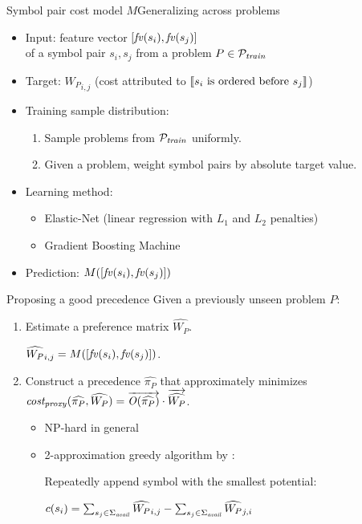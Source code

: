 \documentclass{beamer}
\begin{document}
\begin{frame}{Symbol pair cost model $M$}{Generalizing across problems}
\begin{itemize}
	\item Input: feature vector $[\mathit{fv}(s_i), \mathit{fv}(s_j)]$ \\
	of a symbol pair $s_i, s_j$
	from a problem $P \in \mathcal{P}_{\mathit{train}}$
	\item Target: ${W_P}_{i,j}$ (cost attributed to $\left \llbracket s_i\text{ is ordered before }s_j \right \rrbracket$)
	\item Training sample distribution:
	\begin{enumerate}
		\item Sample problems from $\mathcal{P}_{\mathit{train}}$ uniformly.
		\item Given a problem, weight symbol pairs by absolute target value.
	\end{enumerate}
	\item Learning method:
	\begin{itemize}
		\item Elastic-Net (linear regression with $L_1$ and $L_2$ penalties)
		\item Gradient Boosting Machine
	\end{itemize}
	\item Prediction: $M([\mathit{fv}(s_i), \mathit{fv}(s_j)])$
\end{itemize}
\end{frame}

\begin{frame}{Proposing a good precedence}
Given a previously unseen problem $P$:
\begin{enumerate}
	\item Estimate a preference matrix $\widehat{W_P}$.
	
	$\widehat{W_P}_{i,j} = M([\mathit{fv}(s_i), \mathit{fv}(s_j)])$.
	\item Construct a precedence \(\widehat{\pi_P}\) that approximately minimizes
	$\operatorname{\mathit{cost_{proxy}}}(\widehat{\pi_P}, \widehat{W_P}) = \overrightarrow{\operatorname{\mathit{O}}(\widehat{\pi_P})} \cdot \overrightarrow{\widehat{W_P}}$.
	\begin{itemize}
		\item NP-hard in general
		\item 2-approximation greedy algorithm by \citet{Cohen2011}:
		
		Repeatedly append symbol with the smallest potential:
		
		$c(s_i) = \sum_{s_j \in \operatorname{\Sigma}_{\mathit{avail}}} \widehat{W_P}_{i, j} - \sum_{s_j \in \operatorname{\Sigma}_{\mathit{avail}}} \widehat{W_P}_{j, i}$
	\end{itemize}
\end{enumerate}
\end{frame}
\end{document}
